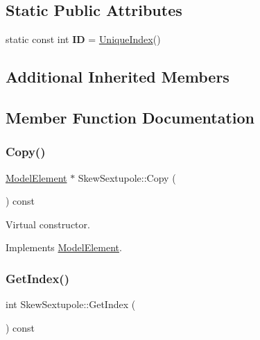 \subsection*{Static Public Attributes}
\begin{DoxyCompactItemize}
\item 
\mbox{\label{classSkewSextupole_ae7060b3c5360a01c1204bd3184f562d2}} 
static const int {\bfseries ID} = \hyperlink{classAcceleratorComponent_aa7ad4d39e1a488b705983842ed1ac784}{Unique\+Index}()
\end{DoxyCompactItemize}
\subsection*{Additional Inherited Members}


\subsection{Member Function Documentation}
\mbox{\label{classSkewSextupole_ac580c5b90fa653d51fd2f7288d65a9c7}} 
\subsubsection{\texorpdfstring{Copy()}{Copy()}}
{\footnotesize\ttfamily \hyperlink{classModelElement}{Model\+Element} $\ast$ Skew\+Sextupole\+::\+Copy (\begin{DoxyParamCaption}{ }\end{DoxyParamCaption}) const\hspace{0.3cm}{\ttfamily [virtual]}}

Virtual constructor. 

Implements \hyperlink{classModelElement_ac3ca26d649bd86a0f31a58ae09941429}{Model\+Element}.

\mbox{\label{classSkewSextupole_a8dbbf55904005b051ad5d84a9140ab10}} 
\subsubsection{\texorpdfstring{Get\+Index()}{GetIndex()}}
{\footnotesize\ttfamily int Skew\+Sextupole\+::\+Get\+Index (\begin{DoxyParamCaption}{ }\end{DoxyParamCaption}) const\hspace{0.3cm}{\ttfamily [virtual]}}

